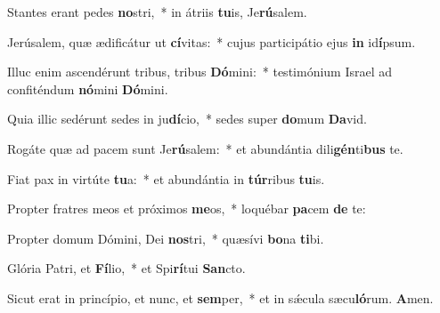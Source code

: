 \item Stantes erant pedes \textbf{no}stri,~* in átriis \textbf{tu}is, Je\textbf{rú}salem.
\item Jerúsalem, quæ ædificátur ut \textbf{cí}vitas:~* cujus participátio ejus \textbf{in} id\textbf{í}psum.
\item Illuc enim ascendérunt tribus, tribus \textbf{Dó}mini:~* testimónium Israel ad confiténdum \textbf{nó}mini \textbf{Dó}mini.
\item Quia illic sedérunt sedes in ju\textbf{dí}cio,~* sedes super \textbf{do}mum \textbf{Da}vid.
\item Rogáte quæ ad pacem sunt Je\textbf{rú}salem:~* et abundántia dili\textbf{gén}ti\textbf{bus} te.
\item Fiat pax in virtúte \textbf{tu}a:~* et abundántia in \textbf{túr}ribus \textbf{tu}is.
\item Propter fratres meos et próximos \textbf{me}os,~* loquébar \textbf{pa}cem \textbf{de} te:
\item Propter domum Dómini, Dei \textbf{nos}tri,~* quæsívi \textbf{bo}na \textbf{ti}bi.
\item Glória Patri, et \textbf{Fí}lio,~* et Spi\textbf{rí}tui \textbf{San}cto.
\item Sicut erat in princípio, et nunc, et \textbf{sem}per,~* et in sǽcula sæcu\textbf{ló}rum. \textbf{A}men.